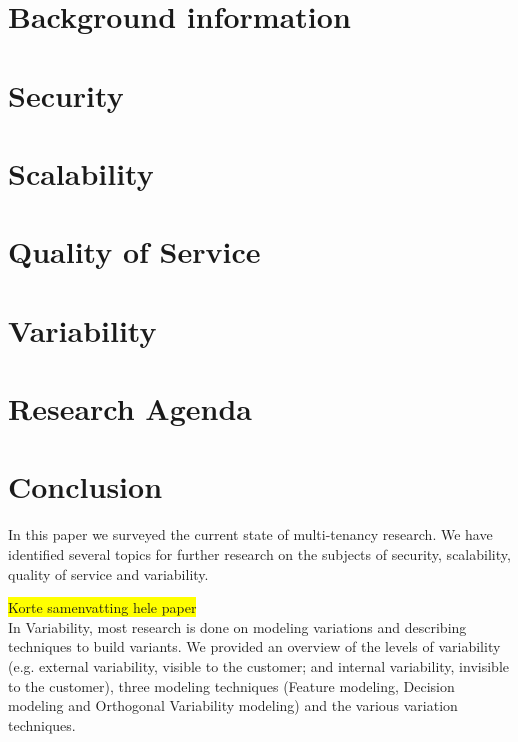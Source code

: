 \documentclass{article}
\newcommand{\highlight}[1]{\colorbox{yellow}{#1}}
\begin{document}
\section{Background information}
\label{sec:bg}


\section{Security}
\label{sec:security}


\section{Scalability}
\label{sec:scalability}


\section{Quality of Service}
\label{sec:qos}


\section{Variability}
\label{sec:variability}


\section{Research Agenda}
\label{sec:ra}


\section{Conclusion}
\label{sec:conclusion}
In this paper we surveyed the current state of multi-tenancy research.
We have identified several topics for further research on the subjects of security, scalability, quality of service and variability.

\highlight{Korte samenvatting hele paper}\\
In Variability, most research is done on modeling variations and describing techniques to build variants. We provided an overview of the levels of variability (e.g. external variability, visible to the customer; and internal variability, invisible to the customer), three modeling techniques (Feature modeling, Decision modeling and Orthogonal Variability modeling) and the various variation techniques.
\end{document}
